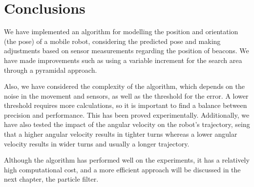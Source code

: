 \section{Conclusions}
We have implemented an algorithm for modelling the position and orientation (the pose) of a mobile robot, considering the predicted pose and making adjustments based on sensor measurements regarding the position of beacons.
We have made improvements such as using a variable increment for the search area through a pyramidal approach.

\bigskip Also, we have considered the complexity of the algorithm, which depends on the noise in the movement and sensors, as well as the threshold for the error. A lower threshold requires more calculations, so it is important to find a balance between precision and performance.
This has been proved experimentally. Additionally, we have also tested the impact of the angular velocity on the robot's trajectory, seing that a higher angular velocity results in tighter turns whereas a lower angular velocity results in wider turns and usually a longer trajectory.

\bigskip Although the algorithm has performed well on the experiments, it has a relatively high computational cost, and a more efficient approach will be discussed in the next chapter, the particle filter.
